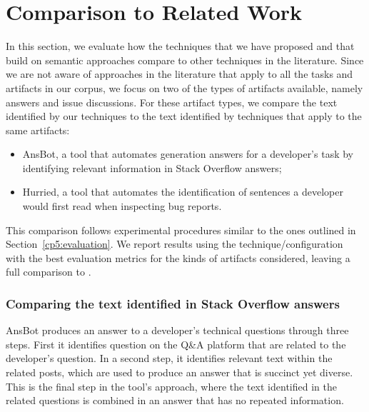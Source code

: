 \section{Comparison to Related Work}
\label{cp5:comparison}





In this section, we evaluate how the techniques that we have proposed and that build on semantic approaches
compare to other techniques in the literature. Since we are not aware of approaches in the literature 
that apply to all the tasks and artifacts in our corpus, we focus on two of the types of artifacts available, 
namely  answers and  issue discussions.
For these artifact types, we compare the text identified 
by our techniques to the text identified by techniques that apply to the same artifacts: 



\begin{itemize}
    \item \acf{AnsBot}, a tool that automates generation answers for a developer's task by identifying relevant information in Stack Overflow answers;
    \item \acf{Hurried}, a tool that automates the identification of sentences a developer would first read when inspecting bug reports.
\end{itemize}





This comparison follows experimental procedures similar to the ones outlined in Section~\ref{cp5:evaluation}.
We report results using the technique/configuration with the best evaluation metrics for the 
kinds of artifacts considered, leaving a full comparison to .




\subsubsection{Comparing the text identified in Stack Overflow answers}



\acs{AnsBot} produces an answer to a developer's technical questions through three steps. 
First it identifies question on the Q\&A platform that are related to the developer's question. 
In a second step, it identifies relevant text within the related posts, which are used 
to produce an answer that is succinct yet diverse.
This is the final step in the tool's approach, where the text identified in the related questions 
is combined in an answer that has no repeated information.


